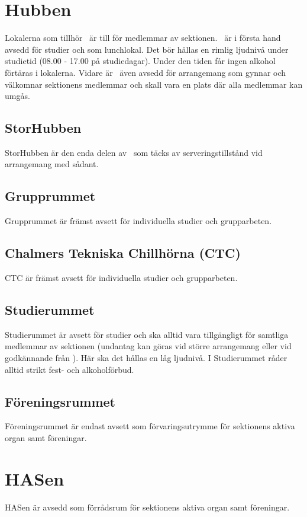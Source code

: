 \documentclass[11pt, includeaddress]{classes/cthit}
\begin{document}
\section{Hubben}
Lokalerna som tillhör \HUBBEN\ är till för medlemmar av sektionen. \HUBBEN\ är i första hand avsedd för
studier och som lunchlokal. Det bör hållas en rimlig ljudnivå under studietid (08.00­ - 17.00 på
studiedagar). Under den tiden får ingen alkohol förtäras i lokalerna. Vidare är \HUBBEN\ även avsedd för
arrangemang som gynnar och välkomnar sektionens medlemmar och skall vara en plats där alla
medlemmar kan umgås.

\subsection{StorHubben}
StorHubben är den enda delen av \HUBBEN\ som täcks av serveringstillstånd vid arrangemang med sådant.

\subsection{Grupprummet}
Grupprummet är främst avsett för individuella studier och grupparbeten.

\subsection{Chalmers Tekniska Chillhörna (CTC)}
CTC är främst avsett för individuella studier och grupparbeten.

\subsection{Studierummet}
Studierummet är avsett för studier och ska alltid vara tillgängligt för samtliga medlemmar av sektionen (undantag kan göras vid större arrangemang eller vid godkännande från \STYRIT{}). Här ska det hållas en låg ljudnivå.
\newline
I Studierummet råder alltid strikt fest- och alkoholförbud.

\subsection{Föreningsrummet}
Föreningsrummet är endast avsett som förvaringsutrymme för sektionens aktiva organ samt föreningar.


\section{HASen}
HASen är avsedd som förrådsrum för sektionens aktiva organ samt föreningar.
\end{document}
